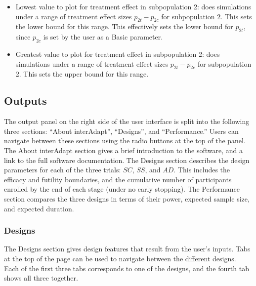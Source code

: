 \documentclass[article]{jss}
\begin{document}
\begin{itemize}
\item Lowest value to plot for treatment effect in subpopulation 2:  does simulations under a range of treatment effect sizes $p_{2t}-p_{2c}$ for subpopulation $2$. This sets the lower bound for this range. This effectively sets the lower bound for $p_{2t}$, since $p_{2c}$ is set by the user as a Basic parameter.

\item Greatest value to plot for treatment effect in subpopulation 2:  does simulations under a range of treatment effect sizes $p_{2t}-p_{2c}$ for subpopulation $2$. This sets the upper bound for this range.


\end{itemize}

\subsection{Outputs}
\label{sub:outputs}

The output panel on the right side of the user interface is split into the following three sections: ``About interAdapt'', ``Designs'', and ``Performance.'' Users can navigate between these sections using the radio buttons at the top of the panel. The About interAdapt section gives a brief introduction to the software, and a link to the full software documentation. The Designs section describes the design parameters for each of the three trials: $SC$, $SS$, and $AD$. This includes the efficacy and futility boundaries, and the cumulative number of participants enrolled by the end of each stage (under no early stopping). The Performance section compares the three designs in terms of their power, expected sample size, and expected duration. 

\subsubsection{Designs}
\label{sub:design}

The Designs section gives design features that result from the user's inputs. Tabs at the top of the page can be used to navigate between the different designs. Each of the first three tabs  corresponds to one of the designs, and the fourth tab shows all three together.
\end{document}
